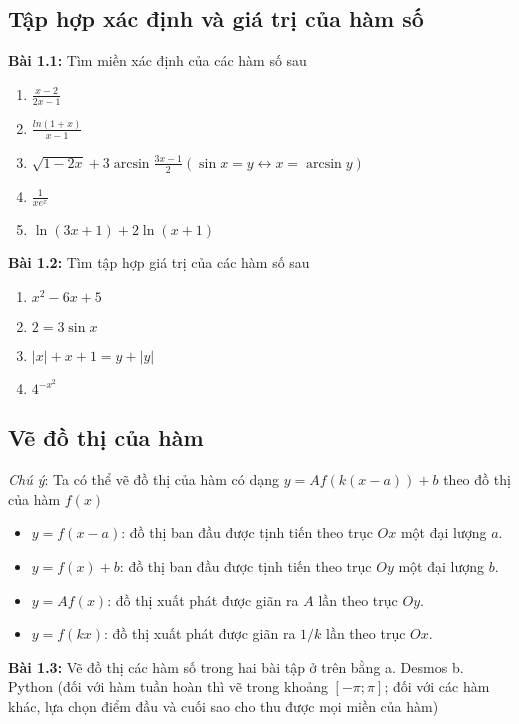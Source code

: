 \subsection*{Tập hợp xác định và giá trị của hàm số}\label{bai1.1-1.2}
\textbf{Bài 1.1:} Tìm miền xác định của các hàm số sau
\begin{enumerate}[label=(\alph*)]
\item \(\frac{x-2}{2x-1}\)
\item \(\frac{ln(1+x)}{x-1}\)
\item \(\sqrt{1-2x}+3\arcsin\frac{3x-1}{2} (\sin{x}=y\leftrightarrow x=\arcsin y) \)
\item \(\frac{1}{xe^x}\)
\item \(\ln{(3x+1)}+2\ln{(x+1)}\)
\end{enumerate}

\vspace{5pt}
\textbf{Bài 1.2:} Tìm tập hợp giá trị của các hàm số sau

\begin{enumerate}[label=(\alph*)]
\item \(x^2 -6x+5\)
\item \(2=3\sin x\)
\item \(\lvert x\rvert +x+1=y+\lvert y\rvert\)
\item \(4^{-x^2}\)
\end{enumerate}


\subsection*{Vẽ đồ thị của hàm}
\emph{Chú ý}: Ta có thể vẽ đồ thị của hàm có dạng $y=Af(k(x-a))+b$ theo đồ thị của hàm $f(x)$
\begin{itemize}
    \item $y=f(x-a)$: đồ thị ban đầu được tịnh tiến theo trục $Ox$ một đại lượng $a$.
    \item $y=f(x)+b$: đồ thị ban đầu được tịnh tiến theo trục $Oy$ một đại lượng $b$.
    \item $y=Af(x)$: đồ thị xuất phát được giãn ra $A$ lần theo trục $Oy$.
    \item $y=f(kx)$: đồ thị xuất phát được giãn ra $1/k$ lần theo trục $Ox$.
\end{itemize}
\textbf{Bài 1.3:} Vẽ đồ thị các hàm số trong hai bài tập ở trên bằng
a. Desmos \newline
b. Python (đối với hàm tuần hoàn thì vẽ trong khoảng $[-\pi;\pi]$; đối với các hàm khác, lựa chọn điểm đầu và cuối sao cho thu được mọi miền của hàm)

